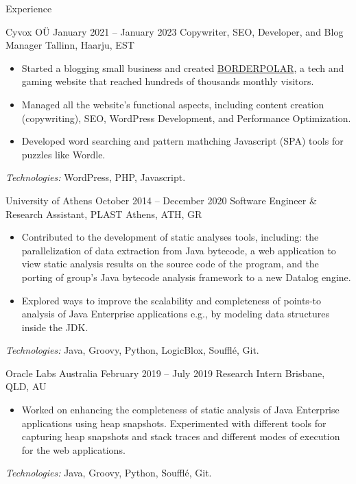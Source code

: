 \documentclass{resume}
\begin{document}
\begin{rSection}{Experience}
  \begin{rSubsection}
    {Cyvox OÜ}
    {January 2021 -- January 2023}
    {Copywriter, SEO, Developer, and Blog Manager}
    {Tallinn, Haarju, EST}
    \begin{itemize}[label={-}]
      \setlength\itemsep{-0.5em}
        \item Started a blogging small business and created \href{http://borderpolar.com}{BORDERPOLAR}, a tech and gaming website that reached hundreds of thousands monthly visitors.
        \item Managed all the website's functional aspects, including content creation (copywriting), SEO, WordPress Development, and Performance Optimization.
        \item Developed word searching and pattern mathching Javascript (SPA) tools for puzzles like Wordle.
    \end{itemize}
  \footnotesize\textcolor{TechsColor}{\textit{Technologies:} WordPress, PHP, Javascript.}
  \end{rSubsection}

\begin{rSubsection}
  {University of Athens}
  {October 2014 -- December 2020}
  {Software Engineer \& Research Assistant, PLAST}
  {Athens, ATH, GR}
  \begin{itemize}[label={-}]
    \setlength\itemsep{-0.5em}
    \item Contributed to the development of static analyses tools, including: the parallelization of data extraction from Java bytecode, a web application to view static analysis results on the source code of the program, and the porting of group's Java bytecode analysis framework to a new Datalog engine.
    \item Explored ways to improve the scalability and completeness of points-to analysis of Java Enterprise applications e.g., by modeling data structures inside the JDK.
  \end{itemize}
\footnotesize\textcolor{TechsColor}{\textit{Technologies:} Java, Groovy, Python, LogicBlox, Soufflé, Git.}
\end{rSubsection}

\begin{rSubsection}
  {Oracle Labs Australia}
  {February 2019 -- July 2019}
  {Research Intern}
  {Brisbane, QLD, AU}
  \begin{itemize}[label={-}]
    \setlength\itemsep{-0.5em}
    \item Worked on enhancing the completeness of static analysis of Java Enterprise applications using heap snapshots. Experimented with different tools for capturing heap snapshots and stack traces and different modes of execution for the web applications.
  \end{itemize}
\footnotesize\textcolor{TechsColor}{\textit{Technologies:} Java, Groovy, Python, Soufflé, Git.}
\end{rSubsection}


\end{rSection}
\end{document}
